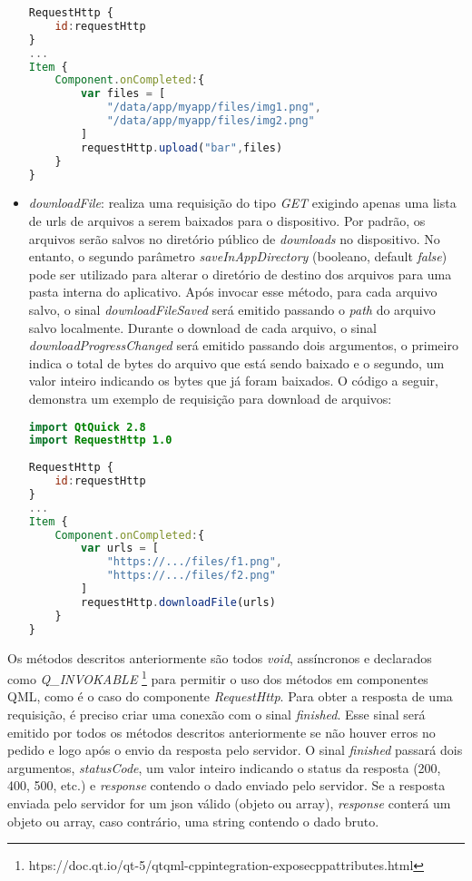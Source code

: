 \begin{itemize}
\begin{center}
\begin{lstlisting}[language=qml]
RequestHttp {
	id:requestHttp
}
...
Item {
	Component.onCompleted:{
		var files = [
			"/data/app/myapp/files/img1.png",
			"/data/app/myapp/files/img2.png"
		]
		requestHttp.upload("bar",files)
	}
}
\end{lstlisting}
\end{center}

	\item \textit{downloadFile}: realiza uma requisição do tipo \textit{GET} exigindo apenas uma lista de urls de arquivos a serem baixados para o dispositivo. Por padrão, os arquivos serão salvos no diretório público de \textit{downloads} no dispositivo. No entanto, o segundo parâmetro \textit{saveInAppDirectory} (booleano, default \textit{false}) pode ser utilizado para alterar o diretório de destino dos arquivos para uma pasta interna do aplicativo. Após invocar esse método, para cada arquivo salvo, o sinal \textit{downloadFileSaved} será emitido passando o \textit{path} do arquivo salvo localmente. Durante o download de cada arquivo, o sinal \textit{downloadProgressChanged} será emitido passando dois argumentos, o primeiro indica o total de bytes do arquivo que está sendo baixado e o segundo, um valor inteiro indicando os bytes que já foram baixados. O código a seguir, demonstra um exemplo de requisição para download de arquivos:
\begin{center}
\begin{lstlisting}[language=qml]
import QtQuick 2.8
import RequestHttp 1.0
	
RequestHttp {
	id:requestHttp
}
...
Item {
	Component.onCompleted:{
		var urls = [
			"https://.../files/f1.png",
			"https://.../files/f2.png"
		]
		requestHttp.downloadFile(urls)
	}
}
\end{lstlisting}
\end{center}

\end{itemize}

Os métodos descritos anteriormente são todos \textit{void}, assíncronos e declarados como \textit{Q\_INVOKABLE} \footnote{htps://doc.qt.io/qt-5/qtqml-cppintegration-exposecppattributes.html} para permitir o uso dos métodos em componentes QML, como é o caso do componente \textit{RequestHttp}. Para obter a resposta de uma requisição, é preciso criar uma conexão com o sinal \textit{finished}. Esse sinal será emitido por todos os métodos descritos anteriormente se não houver erros no pedido e logo após o envio da resposta pelo servidor. O sinal \textit{finished} passará dois argumentos, \textit{statusCode}, um valor inteiro indicando o status da resposta (200, 400, 500, etc.) e \textit{response} contendo o dado enviado pelo servidor. Se a resposta enviada pelo servidor for um json válido (objeto ou array), \textit{response} conterá um objeto ou array, caso contrário, uma string contendo o dado bruto.\par

